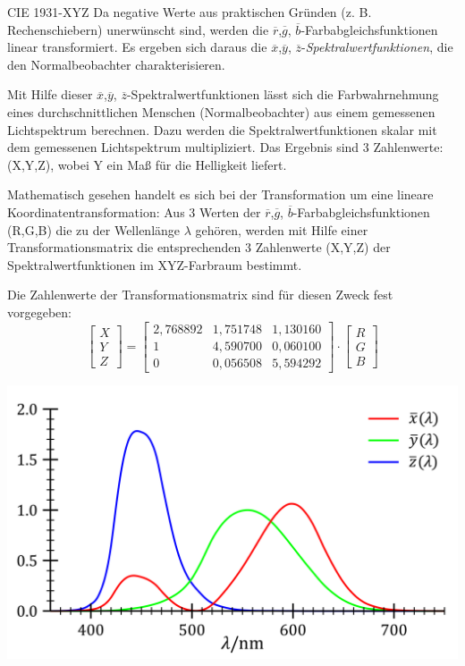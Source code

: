 \begin{bonus}[Farbmodell]{CIE 1931-XYZ}
    Da negative Werte aus praktischen Gründen (z. B. Rechenschiebern) unerwünscht sind, werden die $\overline{r}$,$\overline{g}$, $\overline{b}$-Farbabgleichsfunktionen linear transformiert.
    Es ergeben sich daraus die $\overline{x}$,$\overline{y}$, $\overline{z}$-\emph{Spektralwertfunktionen}, die den Normalbeobachter charakterisieren.

    Mit Hilfe dieser $\overline{x}$,$\overline{y}$, $\overline{z}$-Spektralwertfunktionen lässt sich die Farbwahrnehmung eines durchschnittlichen Menschen (Normalbeobachter) aus einem gemessenen Lichtspektrum berechnen.
    Dazu werden die Spektralwertfunktionen skalar mit dem gemessenen Lichtspektrum multipliziert.
    Das Ergebnis sind 3 Zahlenwerte:
    (X,Y,Z), wobei Y ein Maß für die Helligkeit liefert.

    Mathematisch gesehen handelt es sich bei der Transformation um eine lineare Koordinatentransformation:
    Aus 3 Werten der $\overline{r}$,$\overline{g}$, $\overline{b}$-Farbabgleichsfunktionen  (R,G,B) die zu der Wellenlänge $\lambda$ gehören, werden mit Hilfe einer Transformationsmatrix die entsprechenden 3 Zahlenwerte (X,Y,Z) der Spektralwertfunktionen im XYZ-Farbraum bestimmt.

    Die Zahlenwerte der Transformationsmatrix sind für diesen Zweck fest vorgegeben:
    \[
        \begin{bmatrix}
            X \\ Y \\ Z
        \end{bmatrix}
        =
        \begin{bmatrix}
            2,768892 & 1,751748 & 1,130160 \\
            1        & 4,590700 & 0,060100 \\
            0        & 0,056508 & 5,594292
        \end{bmatrix}
        \cdot
        \begin{bmatrix}
            R \\ G \\ B
        \end{bmatrix}
    \]

    \centering
    \includegraphics[width=.7\linewidth]{figures/CIE_1931_XYZ_Color_Matching_Functions.png}
\end{bonus}

